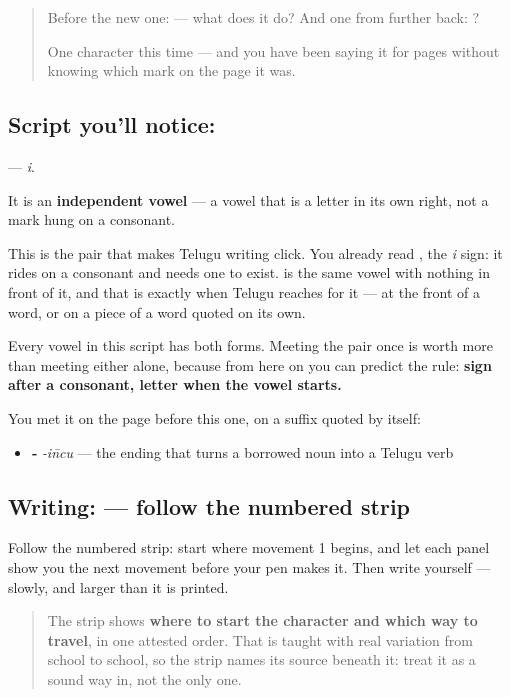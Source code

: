 \label{lesson:TE-S135-letter-i}



\begin{quote}
Before the new one:  — what does it do? And one from further back: ?

One character this time — and you have been saying it for pages without knowing which mark on the page it was.
\end{quote}

\subsection*{Script you'll notice: }
\textbf{} — \emph{i}.

It is an \textbf{independent vowel} — a vowel that is a letter in its own right, not a mark hung on a consonant.

This is the pair that makes Telugu writing click. You already read \textbf{}, the \emph{i} sign: it rides on a consonant and needs one to exist. \textbf{} is the same vowel with nothing in front of it, and that is exactly when Telugu reaches for it — at the front of a word, or on a piece of a word quoted on its own.

Every vowel in this script has both forms. Meeting the pair once is worth more than meeting either alone, because from here on you can predict the rule: \textbf{sign after a consonant, letter when the vowel starts.}

You met it on the page before this one, on a suffix quoted by itself:

\begin{itemize}
\raggedright
  \item \textbf{‑} \emph{‑in̄cu} — the ending that turns a borrowed noun into a Telugu verb
\end{itemize}

\subsection*{Writing:  — follow the numbered strip}

Follow the numbered strip: start where movement 1 begins, and let each panel show you the next movement before your pen makes it. Then write  yourself — slowly, and larger than it is printed.

\begin{quote}
The strip shows \textbf{where to start the character and which way to travel}, in one attested order. That is taught with real variation from school to school, so the strip names its source beneath it: treat it as a sound way in, not the only one.
\end{quote}

